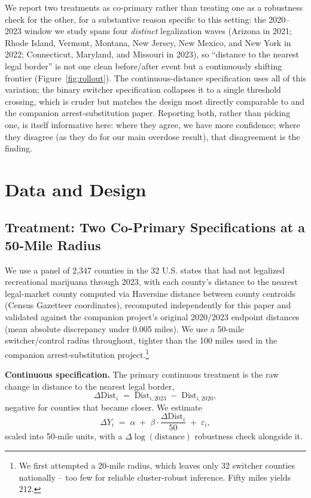 \documentclass[11pt]{article}
\begin{document}
We report two treatments as co-primary rather than treating one as
a robustness check for the other, for a substantive reason specific to
this setting: the 2020--2023 window we study spans four \emph{distinct}
legalization waves (Arizona in 2021; Rhode Island, Vermont, Montana,
New Jersey, New Mexico, and New York in 2022; Connecticut, Maryland,
and Missouri in 2023), so ``distance to the nearest legal border''
is not one clean before/after event but a continuously shifting
frontier (Figure~\ref{fig:rollout}). The continuous-distance
specification uses all of this variation; the binary switcher
specification collapses it to a single threshold crossing, which is
cruder but matches the design most directly comparable to
\citet{HaoCowan2020} and the companion arrest-substitution paper.
Reporting both, rather than picking one, is itself informative here:
where they agree, we have more confidence; where they disagree (as
they do for our main overdose result), that disagreement is the
finding.

\section{Data and Design}

\subsection{Treatment: Two Co-Primary Specifications at a 50-Mile Radius}

We use a panel of 2,347 counties in the 32 U.S. states that had not
legalized recreational marijuana through 2023, with each county's
distance to the nearest legal-market county computed via Haversine
distance between county centroids (Census Gazetteer coordinates),
recomputed independently for this paper and validated against the
companion project's original 2020/2023 endpoint distances (mean
absolute discrepancy under 0.005 miles). We use a 50-mile
switcher/control radius throughout, tighter than the 100 miles used in
the companion arrest-substitution project.\footnote{We first attempted
a 20-mile radius, which leaves only 32 switcher counties nationally --
too few for reliable cluster-robust inference. Fifty miles yields 212.}

\textbf{Continuous specification.} The primary continuous treatment is
the raw change in distance to the nearest legal border,
\begin{equation}
  \Delta\text{Dist}_i \;=\; \text{Dist}_{i,2023} \;-\; \text{Dist}_{i,2020},
  \label{eq:distmi}
\end{equation}
negative for counties that became closer. We estimate
\begin{equation}
  \Delta Y_i \;=\; \alpha \;+\; \beta \cdot \frac{\Delta\text{Dist}_i}{50} \;+\; \varepsilon_i,
  \label{eq:distreg}
\end{equation}
scaled into 50-mile units, with a $\Delta\log(\text{distance})$
robustness check alongside it.
\end{document}
